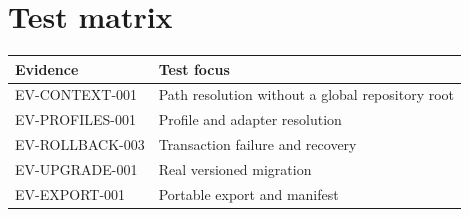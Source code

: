\section{Test matrix}
\label{app:test-matrix}

\begin{tabularx}{\textwidth}{@{}lX@{}}
\toprule
Evidence & Test focus \\
\midrule
EV-CONTEXT-001 & Path resolution without a global repository root \\
EV-PROFILES-001 & Profile and adapter resolution \\
EV-ROLLBACK-003 & Transaction failure and recovery \\
EV-UPGRADE-001 & Real versioned migration \\
EV-EXPORT-001 & Portable export and manifest \\
\bottomrule
\end{tabularx}
